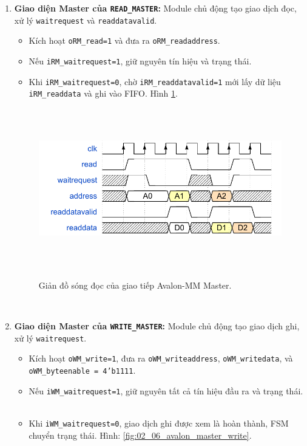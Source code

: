 \begin{enumerate}
    \item \textbf{Giao diện Master của \texttt{READ\_MASTER}:} Module chủ động tạo giao dịch đọc, xử lý \texttt{waitrequest} và \texttt{readdatavalid}.
        \begin{itemize}
            \item Kích hoạt \texttt{oRM\_read=1} và đưa ra \texttt{oRM\_readaddress}.
            \item Nếu \texttt{iRM\_waitrequest=1}, giữ nguyên tín hiệu và trạng thái.
            \item Khi \texttt{iRM\_waitrequest=0}, chờ \texttt{iRM\_readdatavalid=1} mới lấy dữ liệu \texttt{iRM\_readdata} và ghi vào FIFO. Hình \ref{fig:02_05_avalon_master_read}.
        \end{itemize}

    \begin{figure}[htbp]
        \centering
        \includegraphics[width=\linewidth]{Images/02_05_AvalonMaster_ReadWaveform.pdf}
        \caption{Giản đồ sóng đọc của giao tiếp Avalon-MM Master.}
        \label{fig:02_05_avalon_master_read}
    \end{figure}

    \item \textbf{Giao diện Master của \texttt{WRITE\_MASTER}:} Module chủ động tạo giao dịch ghi, xử lý \texttt{waitrequest}.
        \begin{itemize}
            \item Kích hoạt \texttt{oWM\_write=1}, đưa ra \texttt{oWM\_writeaddress}, \texttt{oWM\_writedata}, và \texttt{oWM\_byteenable = 4'b1111}.
            \item Nếu \texttt{iWM\_waitrequest=1}, giữ nguyên tất cả tín hiệu đầu ra và trạng thái.
            \item Khi \texttt{iWM\_waitrequest=0}, giao dịch ghi được xem là hoàn thành, FSM chuyển trạng thái. Hình: \ref{fig:02_06_avalon_master_write}.
        \end{itemize}


\end{enumerate}
